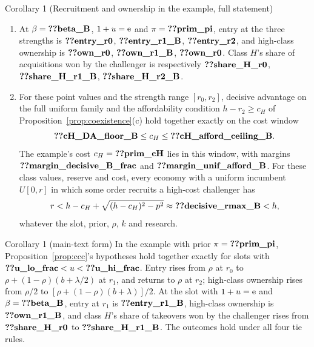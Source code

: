 \begin{named}{Corollary 1 (Recruitment and ownership in the example, full statement)}
\begin{enumerate}[label=(\alph*),leftmargin=2em]
alone hold exactly between the same lower endpoint and \(\tau(r_0)=\reg{tau_r0_frac}\).
\item At \(\beta=\reg{beta_B}\), \(1+u=\mathrm{e}\) and \(\pi=\reg{prim_pi}\), entry at the three strengths is
\(\reg{entry_r0}\), \(\reg{entry_r1_B}\), \(\reg{entry_r2}\), and high-class ownership is
\(\reg{own_r0}\), \(\reg{own_r1_B}\), \(\reg{own_r0}\). Class \(H\)'s share of acquisitions won by the challenger
is respectively \(\reg{share_H_r0}\), \(\reg{share_H_r1_B}\), \(\reg{share_H_r2_B}\).
\item For these point values and the strength range \([r_0,r_2]\), decisive advantage on the full uniform family
and the affordability condition \(h-r_2\ge c_H\) of Proposition~\ref{prop:coexistence}(c) hold together exactly
on the cost window
\[
\reg{cH_DA_floor_B}\le c_H\le\reg{cH_afford_ceiling_B}.
\]
The example's cost \(c_H=\reg{prim_cH}\) lies in this window, with margins
\(\reg{margin_decisive_B_frac}\) and \(\reg{margin_unif_afford_B}\). For these class values, reserve and cost,
every economy with a uniform incumbent \(U[0,r]\) in which some order recruits a high-cost challenger has
\[
r< h-c_H+\sqrt{(h-c_H)^2-p^2}\approx\reg{decisive_rmax_B}<h,
\]
whatever the slot, prior, \(\rho\), \(k\) and research.
\end{enumerate}
\end{named}

\begin{named}{Corollary 1 (main-text form)}
In the example with prior \(\pi=\reg{prim_pi}\), Proposition~\ref{prop:ccc}'s hypotheses hold together exactly
for slots with \(\reg{u_lo_frac}<u<\reg{u_hi_frac}\). Entry rises from \(\rho\) at \(r_0\) to
\(\rho+(1-\rho)(b+\lambda/2)\) at \(r_1\), and returns to \(\rho\) at \(r_2\); high-class ownership
rises from \(\rho/2\) to \([\rho+(1-\rho)(b+\lambda)]/2\). At the slot with \(1+u=\mathrm{e}\) and
\(\beta=\reg{beta_B}\), entry at \(r_1\) is \(\reg{entry_r1_B}\), high-class ownership is \(\reg{own_r1_B}\), and
class \(H\)'s share of takeovers won by the challenger rises from \(\reg{share_H_r0}\) to
\(\reg{share_H_r1_B}\). The outcomes hold under all four tie rules.
\end{named}

